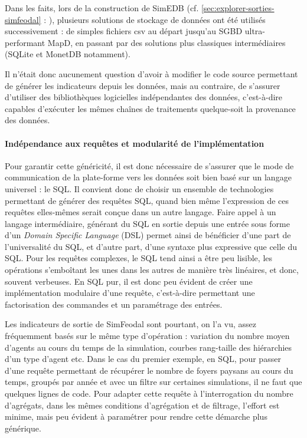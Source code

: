 Dans les faits, lors de la construction de SimEDB (cf. \cref{sec:explorer-sorties-simfeodal} : ), plusieurs solutions de stockage de données ont été utilisés successivement : de simples fichiers csv au départ jusqu'au SGBD ultra-performant MapD, en passant par des solutions plus classiques intermédiaires (SQLite et MonetDB notamment).

Il n'était donc aucunement question d'avoir à modifier le code source permettant de générer les indicateurs depuis les données, mais au contraire, de s'assurer d'utiliser des bibliothèques logicielles indépendantes des données, c'est-à-dire capables d'exécuter les mêmes chaînes de traitements quelque-soit la provenance des données.

\paragraph*{Indépendance aux requêtes et modularité de l'implémentation}\label{par:DSL}

Pour garantir cette généricité, il est donc nécessaire de s'assurer que le mode de communication de la plate-forme vers les données soit bien basé sur un langage universel : le SQL.
Il convient donc de choisir un ensemble de technologies permettant de générer des requêtes SQL, quand bien même l'expression de ces requêtes elles-mêmes serait conçue dans un autre langage.
Faire appel à un langage intermédiaire, générant du SQL en sortie depuis une entrée sous forme d'un \og \textit{Domain Specific Language}\fg{} (DSL) permet ainsi de bénéficier d'une part de l'universalité du SQL, et d'autre part, d'une syntaxe plus expressive que celle du SQL.
Pour les requêtes complexes, le SQL tend ainsi a être peu lisible, les opérations s'emboîtant les unes dans les autres de manière très linéaires, et donc, souvent verbeuses.
En SQL pur, il est donc peu évident de créer une implémentation modulaire d'une requête, c'est-à-dire permettant une factorisation des commandes et un paramétrage des entrées.

Les indicateurs de sortie de SimFeodal sont pourtant, on l'a vu, assez fréquemment basés sur le même type d'opération : variation du nombre moyen d'agents au cours du temps de la simulation, courbes rang-taille des hiérarchies d'un type d'agent etc.
Dans le cas du premier exemple, en SQL, pour passer d'une requête permettant de récupérer le nombre de foyers paysans au cours du temps, groupés par année et avec un filtre sur certaines simulations, il ne faut que quelques lignes de code. Pour adapter cette requête à l'interrogation du nombre d'agrégats, dans les mêmes conditions d'agrégation et de filtrage, l'effort est minime, mais peu évident à paramétrer pour rendre cette démarche plus générique.

